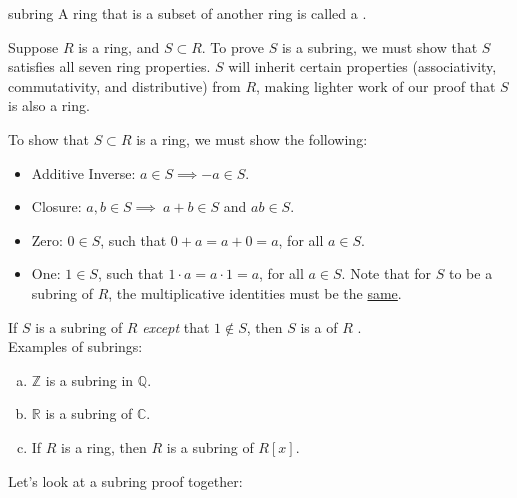 \begin{defn}{subring}
A ring that is a subset of another ring is called a .
\end{defn}

Suppose $R$ is a ring, and $S\subset R$. To prove $S$ is a subring, we must show that $S$ satisfies all seven ring properties. $S$ will inherit certain properties (associativity, commutativity, and distributive) from $R$, making lighter work of our proof that $S$ is also a ring. 

To show that $S\subset R$ is a ring, we must show the following:

\begin{itemize}
\item Additive Inverse:  $a\in S\implies-a\in S$.
\item Closure:  $a,b\in S\implies~a+b\in S$ and $ab\in S$.
\item Zero: $0\in S$, such that $0+a=a+0=a$, for all $a\in S$.
\item One:  $1\in S$, such that $1\cdot a=a\cdot 1=a$, for all $a\in S$. Note that for $S$ to be a subring of $R$, the multiplicative identities must be the \underline{same}.
\end{itemize}

If $S$ is a subring of $R$ \emph{except} that $1\notin S$, then $S$ is a  of $R$ .\\

Examples of subrings:
\begin{enumerate}[(a)]
\item ${\mathbb Z}$ is a subring in ${\mathbb Q}$.
\item ${\mathbb R}$ is a subring of ${\mathbb C}$.
\item If $R$ is a ring, then $R$ is a subring of $R[x]$.
\end{enumerate}

Let's look at a subring proof together:

